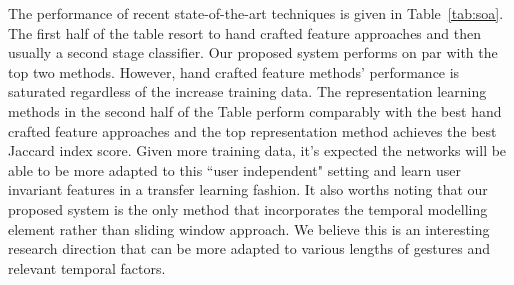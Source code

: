 



The performance of recent state-of-the-art techniques is given in Table~\ref{tab:soa}. The first half of the table resort to hand crafted feature approaches and then usually a second stage classifier. Our proposed system performs on par with the top two methods. However, hand crafted feature methods' performance is saturated regardless of the increase training data. The representation learning methods in the second half of the Table perform comparably with the best hand crafted feature approaches and the top representation method achieves the best Jaccard index score. Given more training data, it's expected the networks will be able to be more adapted to this ``user independent" setting and learn user invariant features in a transfer learning fashion. It also worths noting that our proposed system is the only method that incorporates the temporal modelling element rather than sliding window approach. We believe this is an interesting research direction that can be more adapted to various lengths of gestures and relevant temporal factors.

%


